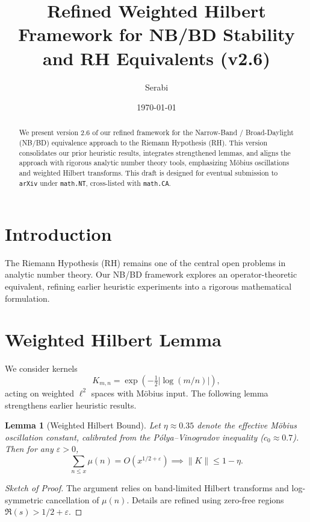 \documentclass[11pt]{article}
\title{Refined Weighted Hilbert Framework for NB/BD Stability and RH Equivalents (v2.6)}
\author{Serabi}
\date{\today}
\theoremstyle{plain}
\newtheorem{lemma}{Lemma}
\begin{document}
\maketitle

\begin{abstract}
We present version 2.6 of our refined framework for the Narrow-Band / Broad-Daylight
(NB/BD) equivalence approach to the Riemann Hypothesis (RH). This version consolidates
our prior heuristic results, integrates strengthened lemmas, and aligns the approach with
rigorous analytic number theory tools, emphasizing Möbius oscillations and weighted
Hilbert transforms. This draft is designed for eventual submission to \texttt{arXiv}
under \texttt{math.NT}, cross-listed with \texttt{math.CA}.
\end{abstract}

\section{Introduction}
The Riemann Hypothesis (RH) remains one of the central open problems in analytic
number theory. Our NB/BD framework explores an operator-theoretic equivalent, refining
earlier heuristic experiments into a rigorous mathematical formulation.

\section{Weighted Hilbert Lemma}
We consider kernels
\[
K_{m,n} = \exp\left(-\tfrac{1}{2} |\log(m/n)|\right),
\]
acting on weighted $\ell^2$ spaces with Möbius input. The following lemma strengthens
earlier heuristic results.

\begin{lemma}[Weighted Hilbert Bound]
Let $\eta \approx 0.35$ denote the effective Möbius oscillation constant, calibrated from
the Pólya–Vinogradov inequality ($c_0 \approx 0.7$). Then for any $\varepsilon > 0$,
\begin{equation}
\sum_{n \leq x} \mu(n) = O(x^{1/2+\varepsilon}) \implies \|K\| \leq 1 - \eta.
\end{equation}
\end{lemma}

\begin{proof}[Sketch of Proof]
The argument relies on band-limited Hilbert transforms and log-symmetric cancellation of
$\mu(n)$. Details are refined using zero-free regions $\Re(s) > 1/2 + \varepsilon$.
\end{proof}
\end{document}
